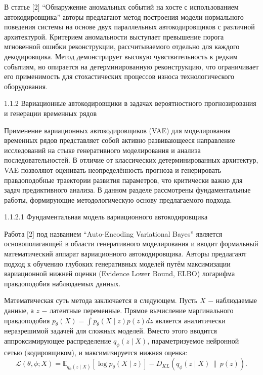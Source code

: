 \documentclass[14pt, a4paper, oneside]{extreport}
\begin{document}
В статье $[$2$]$ “Обнаружение аномальных событий на хосте с использованием автокодировщика” авторы предлагают метод построения модели нормального поведения системы на основе двух параллельных автокодировщиков с различной архитектурой. Критерием аномальности выступает превышение порога мгновенной ошибки реконструкции, рассчитываемого отдельно для каждого декодировщика. Метод демонстрирует высокую чувствительность к редким событиям, но опирается на детерминированную реконструкцию, что ограничивает его применимость для стохастических процессов износа технологического оборудования.


\vspace{1em}
{1.1.2 Вариационные автокодировщики в задачах вероятностного прогнозирования и генерации временных рядов}
\vspace{1em}

Применение вариационных автокодировщиков (VAE) для моделирования временных рядов представляет собой активно развивающееся направление исследований на стыке генеративного моделирования и анализа последовательностей. В отличие от классических детерминированных архитектур, VAE позволяют оценивать неопределённость прогноза и генерировать правдоподобные траектории развития параметров, что критически важно для задач предиктивного анализа. В данном разделе рассмотрены фундаментальные работы, формирующие методологическую основу предлагаемого подхода.

\vspace{1em}
1.1.2.1 Фундаментальная модель вариационного автокодировщика
\vspace{1em}

Работа $[$2$]$ под названием “Auto-Encoding Variational Bayes” является основополагающей в области генеративного моделирования и вводит формальный математический аппарат вариационного автокодировщика. Авторы предлагают подход к обучению глубоких генеративных моделей путём максимизации вариационной нижней оценки (Evidence Lower Bound, ELBO) логарифма правдоподобия наблюдаемых данных.

Математическая суть метода заключается в следующем. Пусть $X$ $-$ наблюдаемые данные, а $z$ $-$ латентные переменные. Прямое вычисление маргинального правдоподобия $p_\theta(X) = \int p_\theta(X \mid z) p(z) dz$ является аналитически неразрешимой задачей для сложных моделей. Вместо этого вводится аппроксимирующее распределение $q_\phi(z \mid X)$, параметризуемое нейронной сетью (кодировщиком), и максимизируется нижняя оценка:
\begin{equation}
\mathcal{L}(\theta, \phi; X) = \mathbb{E}_{q_\phi(z \mid X)}\left[\log p_\theta(X \mid z)\right] - D_{KL}\left(q_\phi(z \mid X) \,\|\, p(z)\right).
\end{equation}
\end{document}
